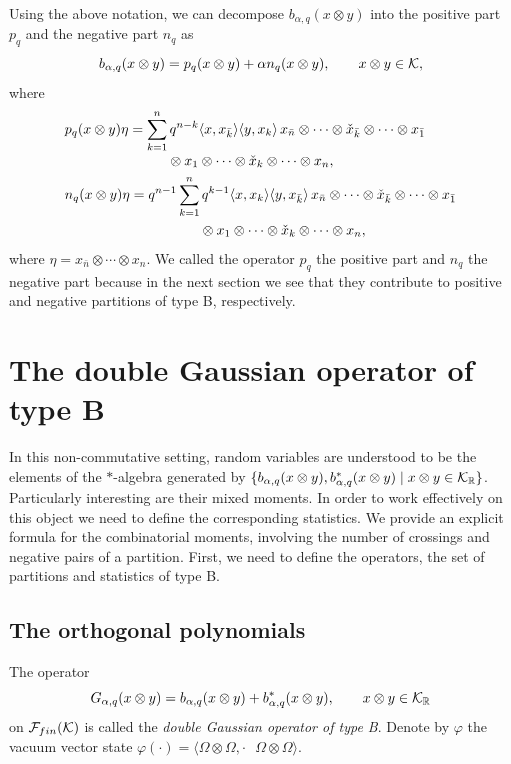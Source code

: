 \documentclass[11pt]{article}
\numberwithin{equation}{section}
\numberwithin{equation}{section}
\def\R{{\mathbb R}}
\def\B{b_{\s,\q}}
\def\G{G_{\s,\q}}
\def\ell {n}
\def\F{\mathcal{F}_{\rm fin}(\HH)}
\def\state {\varphi}
\def\HH{{\bf \mathcal K}}
\newcommand{\q}{q}
\newcommand{\s}{\alpha}%
\begin{document}
\begin{Remark}\label{thm1}
	Using the above notation, we can decompose $\B(x\otimes y)$ into the positive part $p_\q$ and the negative part $\ell_{\q}$ as\vspace{-1mm}
\[
	\B(x\otimes y)= p_\q(x\otimes y)+ \s \ell_{\q}(x\otimes y), \qquad x\otimes y \in \HH,
\]
where\vspace{-2mm}
\begin{align}\label{rq}
&p_\q(x\otimes y)\eta = \sum_{k=1}^n \q^{n-k}\langle x, x_{\bar{k}}\rangle \langle y, x_k \rangle\, x_{\bar n }\otimes \cdots \otimes \check{x}_{\bar k} \otimes \cdots \otimes x_{\bar 1} \nonumber
\\[-1mm]
&\hphantom{p_\q(x\otimes y)\eta = \sum_{k=1}^n}
{}\otimes x_1\otimes \cdots \otimes \check{x}_k \otimes \cdots \otimes x_n,
\\
&\ell_{\q}(x\otimes y)\eta =\q^{n-1}\sum_{k=1}^n \q^{k-1}\langle x, x_{{k}}\rangle \langle y, x_{\bar{k}}\rangle\, x_{\bar n }\otimes \cdots \otimes \check{x}_{\bar k} \otimes \cdots \otimes x_{\bar 1} \nonumber
\\
&\hphantom{\ell_{\q}(x\otimes y)\eta =\q^{n-1}\sum_{k=1}^n}
\otimes x_1\otimes \cdots \otimes \check{x}_k \otimes \cdots \otimes x_n,\label{lq}
	\end{align}
	where $\eta=x_{\bar n }\otimes \cdots \otimes x_n$.
	We called the operator $p_\q$ the positive part and $\ell_{\q}$ the negative part because in the next section we see that they contribute to positive and negative partitions of type B, respectively.
\end{Remark}


\section{The double Gaussian operator of type B }
In this non-commutative setting, random variables are understood to be the elements of the
$\ast$-algebra generated by $\{\B(x\otimes y) ,\B^\ast(x\otimes y)\mid x\otimes y \in \HH_\R\}$. Particularly interesting are their mixed moments.
In order to work effectively on this object we need to define the corresponding statistics. We provide an explicit formula for the combinatorial moments, involving the number of crossings and negative pairs of a partition. First, we need to define the operators, the set of partitions and statistics of type B.

\subsection{The orthogonal polynomials}
\begin{Definition}
	The operator
	\begin{equation*}
		\G(x\otimes y)= \B(x\otimes y) +\B^\ast(x\otimes y),\qquad x\otimes y \in \HH_\R
	\end{equation*}
	on $\F$ is called the \emph{double Gaussian operator of type B}.
Denote by $\state$ the vacuum vector state $\state(\cdot)=\langle\Omega \otimes \Omega, \cdot\text{ } \Omega\otimes \Omega\rangle$.
\end{Definition}
\end{document}
